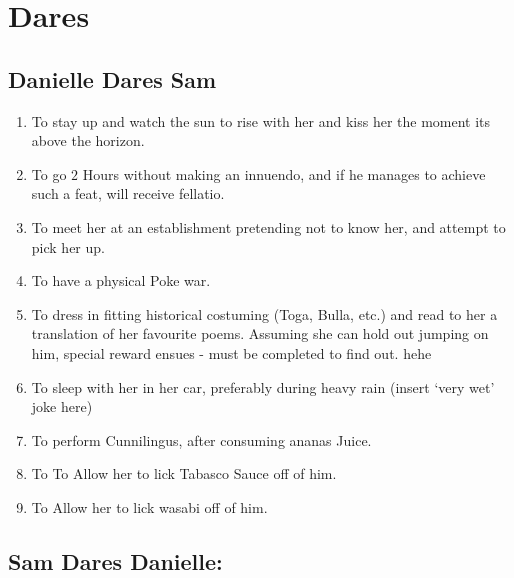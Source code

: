 
 

 \section{Dares}

 \renewcommand{\theenumi}{\thesubsection.\arabic{enumi}}

   \subsection{Danielle Dares Sam}

\begin{enumerate}
\item  To stay up and watch the sun to rise with her and kiss her the moment its above the horizon.

\item  To go $2$ Hours without making an innuendo, and if he manages to achieve such a feat, will receive fellatio.

\item  To meet her at an establishment pretending not to know her, and attempt to pick her up.

\item  To have a physical Poke war. 

\item  To dress in fitting historical costuming (Toga, Bulla, etc.) and read to her a translation of her favourite poems.  Assuming she can hold out  jumping on him, special reward ensues - must be completed to find out.  hehe 

\item  To sleep with her in her car, preferably during heavy rain (insert `very wet' joke here) 

\item To perform Cunnilingus, after consuming ananas Juice.

\item To To Allow her to lick Tabasco Sauce off of him.

\item To Allow her to lick wasabi off of him.

\end{enumerate}

 

  \subsection{Sam Dares Danielle:}

